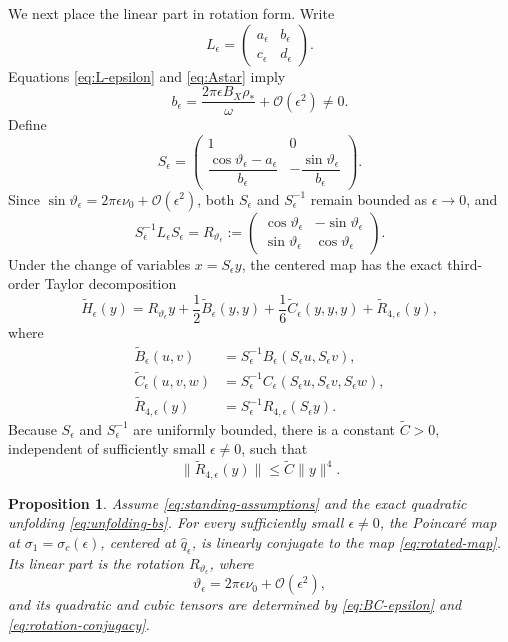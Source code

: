 \documentclass[11pt]{amsart}
\newtheorem{proposition}[theorem]{Proposition}
\theoremstyle{remark}
\newcommand{\cO}{\mathcal{O}}
\begin{document}
We next place the linear part in rotation form.  Write
\[
 L_\epsilon=
 \begin{pmatrix}a_\epsilon&b_\epsilon\\c_\epsilon&d_\epsilon\end{pmatrix}.
\]
Equations \eqref{eq:L-epsilon} and \eqref{eq:Astar} imply
\[
 b_\epsilon=\frac{2\pi\epsilon B_X\rho_*}{\omega}+\cO(\epsilon^2)\ne0.
\]
Define
\[
S_\epsilon=
\begin{pmatrix}
1&0\\[1mm]
\dfrac{\cos\vartheta_\epsilon-a_\epsilon}{b_\epsilon}
&-\dfrac{\sin\vartheta_\epsilon}{b_\epsilon}
\end{pmatrix}.
\]
Since \(\sin\vartheta_\epsilon=2\pi\epsilon\nu_0+\cO(\epsilon^2)\), both
\(S_\epsilon\) and \(S_\epsilon^{-1}\) remain bounded as
\(\epsilon\to0\), and
\begin{equation}\label{eq:rotation-conjugacy}
 S_\epsilon^{-1}L_\epsilon S_\epsilon
=R_{\vartheta_\epsilon}:=
\begin{pmatrix}
\cos\vartheta_\epsilon&-\sin\vartheta_\epsilon\\
\sin\vartheta_\epsilon&\cos\vartheta_\epsilon
\end{pmatrix}.
\end{equation}
Under the change of variables \(x=S_\epsilon y\), the centered map has the
exact third-order Taylor decomposition
\begin{equation}\label{eq:rotated-map}
\widetilde H_\epsilon(y)
=R_{\vartheta_\epsilon}y
+\frac12\widetilde B_\epsilon(y,y)
+\frac16\widetilde C_\epsilon(y,y,y)
+\widetilde R_{4,\epsilon}(y),
\end{equation}
where
\[
\begin{aligned}
\widetilde B_\epsilon(u,v)
&=S_\epsilon^{-1}B_\epsilon(S_\epsilon u,S_\epsilon v),\\
\widetilde C_\epsilon(u,v,w)
&=S_\epsilon^{-1}C_\epsilon(S_\epsilon u,S_\epsilon v,S_\epsilon w),\\
\widetilde R_{4,\epsilon}(y)
&=S_\epsilon^{-1}R_{4,\epsilon}(S_\epsilon y).
\end{aligned}
\]
Because \(S_\epsilon\) and \(S_\epsilon^{-1}\) are uniformly bounded, there
is a constant \(\widetilde C>0\), independent of sufficiently small
\(\epsilon\ne0\), such that
\[
 \|\widetilde R_{4,\epsilon}(y)\|
\le\widetilde C\|y\|^4.
\]

\begin{proposition}\label{prop:cubic-jet}
Assume \eqref{eq:standing-assumptions} and the exact quadratic unfolding
\eqref{eq:unfolding-bs}.  For every sufficiently small \(\epsilon\ne0\), the
Poincar\'e map at \(\sigma_1=\sigma_c(\epsilon)\), centered at
\(\widehat q_\epsilon\), is linearly conjugate to the map
\eqref{eq:rotated-map}.  Its linear part is the rotation
\(R_{\vartheta_\epsilon}\), where
\[
 \vartheta_\epsilon=2\pi\epsilon\nu_0+\cO(\epsilon^2),
\]
and its quadratic and cubic tensors are determined by
\eqref{eq:BC-epsilon} and \eqref{eq:rotation-conjugacy}.
\end{proposition}
\end{document}

